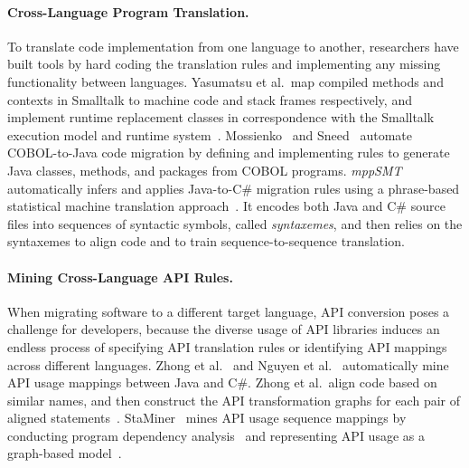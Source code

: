 \paragraph{{Cross-Language Program Translation.}}
To translate code implementation from one language to another, researchers have built tools by hard coding the translation rules and implementing any missing functionality between languages. %
Yasumatsu et al.~map compiled methods and contexts in Smalltalk to machine code and stack frames respectively, and implement runtime replacement classes in correspondence with the Smalltalk execution model and runtime system~\cite{Yasumatsu:95}. Mossienko~\cite{1192409:03} and Sneed~\cite{Sneed:2010} automate COBOL-to-Java code migration by defining and implementing rules to generate Java classes, methods, and packages from COBOL programs. 
{\em mppSMT} automatically infers and applies Java-to-C\# migration rules using a phrase-based statistical machine translation approach~\cite{7372046}. It encodes both Java and C\# source files into sequences of syntactic symbols, called {\em syntaxemes}, and then relies on the syntaxemes to align code and to train sequence-to-sequence translation. 

\paragraph{{Mining Cross-Language API Rules.}}
When migrating software to a different target language, API conversion poses a challenge for developers, because the diverse usage of API libraries induces an endless process of specifying API translation rules or identifying API mappings across different languages. Zhong et al.~\cite{zhong2010mining} and Nguyen et al.~\cite{nguyen2014statistical,Nguyen:2017:EAE} automatically mine API usage mappings between Java and C\#. Zhong et al.~align code based on similar names, and then construct the API transformation graphs for each pair of aligned statements~\cite{zhong2010mining}. StaMiner~\cite{nguyen2014statistical} mines API usage sequence mappings by conducting program dependency analysis~\cite{Muchnick:1998} and representing API usage as a graph-based model~\cite{Nguyen09}. %

